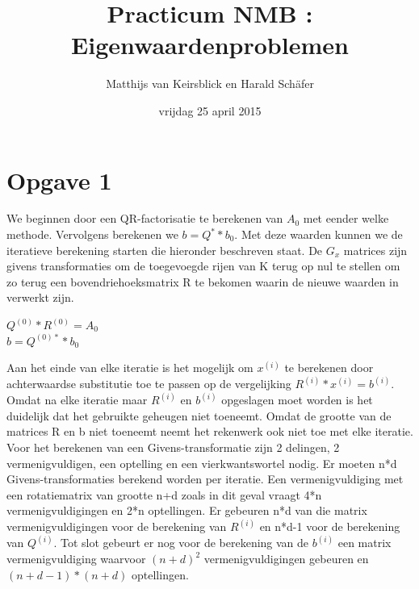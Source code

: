 \documentclass[]{article}
\title{Practicum NMB : Eigenwaardenproblemen}
\author{Matthijs van Keirsblick en Harald Sch\"{a}fer}
\date{vrijdag 25 april 2015}
\newcommand{\opgave}[1]{\pagebreak\section*{Opgave #1}}
\begin{document}
\maketitle
\opgave{1}


We beginnen door een QR-factorisatie te berekenen van $A_{0}$ met eender welke methode. Vervolgens berekenen we $b = Q^{*}*b_{0}$. Met deze waarden kunnen we de iteratieve berekening starten die hieronder beschreven staat. De $G_{x}$ matrices zijn givens transformaties om de toegevoegde rijen van K terug op nul te stellen om zo terug een bovendriehoeksmatrix R te bekomen waarin de nieuwe waarden in verwerkt zijn.


\begin{framed}
\begin{algorithm}[H] 
 $Q^{(0)}*R^{(0)} = A_{0}$\\
 $b = Q^{(0)*}*b_{0}$\\
 
\end{algorithm}
\end{framed}

\noindent Aan het einde van elke iteratie is het mogelijk om $x^{(i)}$ te berekenen door achterwaardse substitutie toe te passen op de vergelijking $R^{(i)}*x^{(i)} = b^{(i)}$. Omdat na elke iteratie maar $R^{(i)}$ en  $b^{(i)}$ opgeslagen moet worden is het duidelijk dat het gebruikte geheugen niet toeneemt. Omdat de grootte van de matrices R en b niet toeneemt neemt het rekenwerk ook niet toe met elke iteratie. Voor het berekenen van een Givens-transformatie zijn 2 delingen, 2 vermenigvuldigen, een optelling en een vierkwantswortel nodig. Er moeten n*d Givens-transformaties berekend worden per iteratie. Een vermenigvuldiging met een rotatiematrix van grootte n+d zoals in dit geval vraagt 4*n vermenigvuldigingen en 2*n optellingen. Er gebeuren n*d van die matrix vermenigvuldigingen voor de berekening van $R^{(i)}$ en n*d-1 voor de berekening van $Q^{(i)}$. Tot slot  gebeurt er nog voor de berekening van de $b^{(i)}$ een matrix vermenigvuldiging waarvoor $(n+d)^2$ vermenigvuldigingen gebeuren en $(n+d-1)*(n+d)$ optellingen.
\end{document}
